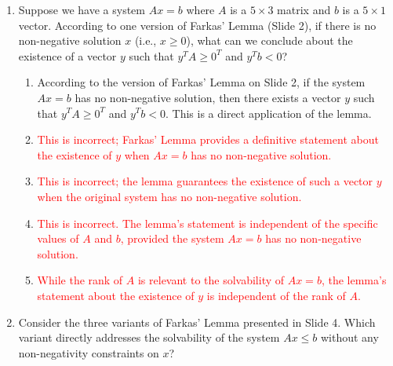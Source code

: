 \documentclass{article}%
\newcommand{\incorrect}[1]{\textcolor{red}{#1}}
\begin{document}
\begin{enumerate}
\begin{enumerate}
\begin{enumerate}
\item \incorrect{This is incorrect because Farkas' Lemma provides a definitive statement about the existence of $y$ when $Ax \le b$ has no solution.}%
\item \incorrect{This is incorrect; Farkas' Lemma guarantees the existence of such a vector $y$ when the original system has no solution.}%
\item \incorrect{This is incorrect. The lemma's statement is independent of the specific values of $A$ and $b$, provided the system $Ax \le b$ is infeasible.}%
\item \incorrect{This is incorrect. The dimensions of $A$ and $b$ influence the dimensions of $y$, but the lemma's core statement holds regardless of the relationship between $m$ and $n$.}%
\end{enumerate}%
\vspace{0.5em}%
\item Suppose we have a system $Ax = b$ where $A$ is a $5 \times 3$ matrix and $b$ is a $5 \times 1$ vector.  According to one version of Farkas' Lemma (Slide 2), if there is no non-negative solution $x$ (i.e., $x \ge 0$), what can we conclude about the existence of a vector $y$ such that $y^T A \ge 0^T$ and $y^T b < 0$?%
\begin{enumerate}%
\item According to the version of Farkas' Lemma on Slide 2, if the system $Ax = b$ has no non-negative solution, then there exists a vector $y$ such that $y^T A \ge 0^T$ and $y^T b < 0$. This is a direct application of the lemma.%
\item \incorrect{This is incorrect; Farkas' Lemma provides a definitive statement about the existence of $y$ when $Ax = b$ has no non-negative solution.}%
\item \incorrect{This is incorrect; the lemma guarantees the existence of such a vector $y$ when the original system has no non-negative solution.}%
\item \incorrect{This is incorrect. The lemma's statement is independent of the specific values of $A$ and $b$, provided the system $Ax = b$ has no non-negative solution.}%
\item \incorrect{While the rank of $A$ is relevant to the solvability of $Ax = b$, the lemma's statement about the existence of $y$ is independent of the rank of $A$.}%
\end{enumerate}%
\vspace{0.5em}%
\item Consider the three variants of Farkas' Lemma presented in Slide 4.  Which variant directly addresses the solvability of the system $Ax \le b$ without any non-negativity constraints on $x$?%

\end{enumerate}
\end{enumerate}
\end{document}
